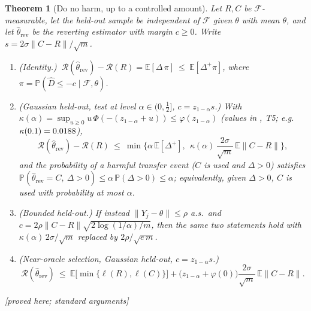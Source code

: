 \documentclass[10pt,a4paper]{article}
\theoremstyle{plain}
\newtheorem{theorem}{Theorem}[section]
\theoremstyle{definition}
\theoremstyle{remark}
\newcommand{\E}{\mathbb{E}}
\newcommand{\Prob}{\mathbb{P}}
\newcommand{\risk}{\mathcal{R}}
\newcommand{\Dh}{\widehat{D}}
\newcommand{\rev}{\mathrm{rev}}
\newcommand{\norm}[1]{\lVert #1\rVert}
\newcommand{\status}[1]{\textsf{\small [#1]}}
\begin{document}
\begin{theorem}[Do no harm, up to a controlled amount]\label{thm:safe}
Let $R,C$ be $\mathcal F$-measurable, let the held-out sample be independent of $\mathcal F$ given $\theta$ with mean $\theta$, and let $\hat\theta_\rev$ be the reverting estimator with margin $c\ge0$. Write $s=2\sigma\norm{C-R}/\sqrt m$.
\begin{enumerate}[leftmargin=2em,label=(\roman*)]
\item \textup{(Identity.)} $\ \risk(\hat\theta_\rev)-\risk(R)=\E[\Delta\,\pi]\ \le\ \E[\Delta^+\pi]$, where $\pi=\Prob(\Dh\le-c\mid\mathcal F,\theta)$.
\item \textup{(Gaussian held-out, test at level $\alpha\in(0,\tfrac12]$, $c=z_{1-\alpha}s$.)} With $\kappa(\alpha)=\sup_{u\ge0}u\,\Phi(-(z_{1-\alpha}+u))\le\varphi(z_{1-\alpha})$ (values in , T5; e.g.\ $\kappa(0.1)=0.0188$),
\[
\risk(\hat\theta_\rev)-\risk(R)\ \le\ \min\Big\{\alpha\,\E[\Delta^+],\ \ \kappa(\alpha)\,\frac{2\sigma}{\sqrt m}\,\E\norm{C-R}\Big\},
\]
and the probability of a \emph{harmful transfer event} ($C$ is used and $\Delta>0$) satisfies $\Prob(\hat\theta_\rev=C,\ \Delta>0)\le\alpha\,\Prob(\Delta>0)\le\alpha$; equivalently, given $\Delta>0$, $C$ is used with probability at most $\alpha$.
\item \textup{(Bounded held-out.)} If instead $\norm{Y_j-\theta}\le\rho$ a.s.\ and $c=2\rho\norm{C-R}\sqrt{2\log(1/\alpha)/m}$, then the same two statements hold with $\kappa(\alpha)\,2\sigma/\sqrt m$ replaced by $2\rho/\sqrt{e\,m}$.
\item \textup{(Near-oracle selection, Gaussian held-out, $c=z_{1-\alpha}s$.)}
\[
\risk(\hat\theta_\rev)\ \le\ \E\big[\min\{\ell(R),\ell(C)\}\big]+\big(z_{1-\alpha}+\varphi(0)\big)\frac{2\sigma}{\sqrt m}\,\E\norm{C-R}.
\]
\end{enumerate}
\status{proved here; standard arguments}
\end{theorem}
\end{document}
